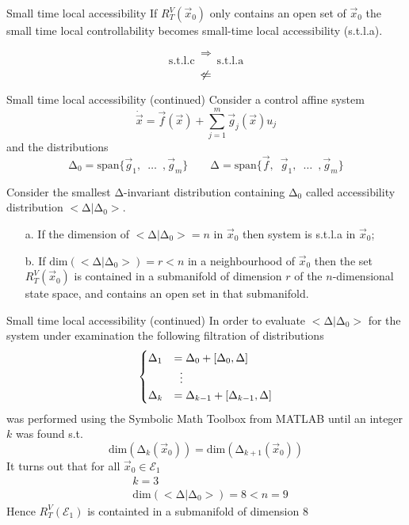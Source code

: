 \begin{frame}{Small time local accessibility}
  If $R_{T}^{V}(\vec{x}_0)$ only contains an open set of $\vec{x}_0$
  the small time local controllability becomes small-time local accessibility
  (s.t.l.a).
  \par
  \[
  \Rightarrow
  \]
  \[
  \text{s.t.l.c} \qquad \text{s.t.l.a}
  \]
  \[
  \centernot \Leftarrow
  \]
\end{frame}

\begin{frame}[shrink=10]{Small time local accessibility (continued)}
  Consider a control affine system
  \[
  \dot{\vec{x}} = \vec{f}(\vec{x}) + \sum\limits_{j=1}^{m}\vec{g}_j(\vec{x}) u_{j}
  \]
  and the distributions
  \[
  \mathrm{\Delta}_0 = \mathrm{span} \{\vec{g}_1, \enspace \hdots \enspace, \vec{g}_m\} \quad
  \quad
  \mathrm{\Delta} = \mathrm{span} \{\vec{f},\enspace\vec{g}_1, \enspace \hdots \enspace, \vec{g}_m\}
  \]
  \begin{theorem}
    Consider the smallest $\mathrm{\Delta}$-invariant distribution containing $\mathrm{\Delta}_0$
    called accessibility distribution $<\mathrm{\Delta}|\mathrm{\Delta}_0>$.
    \begin{itemize}
    \item[a.]If the dimension of $<\mathrm{\Delta}|\mathrm{\Delta}_0>= n$ in $\vec{x}_0$ then system
      is s.t.l.a in $\vec{x}_{0}$;
    \item[b.]If $\mathrm{dim}(<\mathrm{\Delta}|\mathrm{\Delta}_0>)= r < n$ in a neighbourhood of $\vec{x}_0$
      then the set $R_{T}^{V}(\vec{x}_0)$ is contained in a submanifold of dimension $r$ of the
      $n$-dimensional state space, and contains an open set in that submanifold.
    \end{itemize}
  \end{theorem}
\end{frame}

\begin{frame}[shrink=10]{Small time local accessibility (continued)}
  In order to evaluate $<\mathrm{\Delta}|\mathrm{\Delta}_0>$ for the system under examination
  the following filtration of distributions
  \[
  \begin{cases}
    \mathrm{\Delta}_1 &= \mathrm{\Delta}_0 + [\mathrm{\Delta}_0,\mathrm{\Delta}]\\
    &\vdotswithin{=} \\
    \mathrm{\Delta}_k &= \mathrm{\Delta}_{k-1} + [\mathrm{\Delta}_{k-1},\mathrm{\Delta}]
  \end{cases}
  \]
  was performed using the Symbolic Math Toolbox from MATLAB until an integer $k$ was found s.t.
  \[
  \text{dim}(\mathrm{\Delta}_{k}(\vec{x}_0)) = \text{dim}(\mathrm{\Delta}_{k+1}(\vec{x}_0))
  \]
  It turns out that for all $\vec{x}_{0} \in \mathcal{E}_{1}$ 
  \[
  \begin{split}
    &k = 3\\
    &\mathrm{dim}(<\mathrm{\Delta}|\mathrm{\Delta}_0>) = 8 < n = 9
  \end{split}
  \]
  Hence $R_{T}^{V}(\mathcal{E}_{1})$ is containted in a submanifold of dimension $8$

\end{frame}

